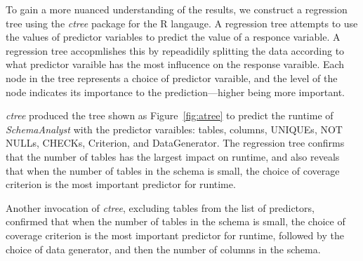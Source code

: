 To gain a more nuanced understanding of the results, we construct a
regression tree using the \textit{ctree} package for the R langauge. A
regression tree attempts to use the values of predictor variables to
predict the value of a responce variable. A regression tree accopmlishes
this by repeadidily splitting the data according to what predictor varaible has the
most influcence on the response varaible. Each node in the tree represents a choice
of predictor varaible, and the level of the node indicates its
importance to the prediction---higher being more important.

\textit{ctree} produced the tree shown as Figure~\ref{fig:atree} to
predict the runtime of \textit{SchemaAnalyst} with the predictor varaibles:
tables, columns, UNIQUEs, NOT NULLs, CHECKs, Criterion, and
DataGenerator. The regression tree confirms that the number of
tables has the largest impact on runtime, and also reveals that when the number of tables in the schema is small, 
the choice of coverage criterion is the most important predictor for runtime.

Another invocation of \textit{ctree}, excluding tables from the list of
predictors, confirmed that when the number of tables in the schema is small, the choice of coverage criterion is the
most important predictor for runtime, followed by the choice of data
generator, and then the number of columns in the schema.
